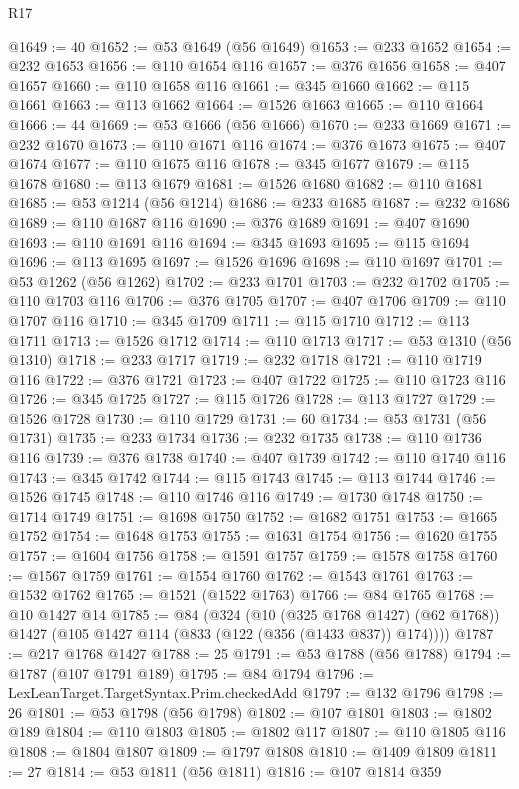 \begin{lexlean}{R17}
\begin{coremodule}
{{{{{{{{{{{{{{{{{{{{{{{{{{{{{{{{{{{{{{{{{{{{{{{{{{{{{{{{{{{{{{{{{{{{{{{{{{{{{{{{{{{{{@1649 := 40
@1652 := @53 @1649 (@56 @1649)
@1653 := @233 @1652
@1654 := @232 @1653
@1656 := @110 @1654 @116
@1657 := @376 @1656
@1658 := @407 @1657
@1660 := @110 @1658 @116
@1661 := @345 @1660
@1662 := @115 @1661
@1663 := @113 @1662
@1664 := @1526 @1663
@1665 := @110 @1664
@1666 := 44
@1669 := @53 @1666 (@56 @1666)
@1670 := @233 @1669
@1671 := @232 @1670
@1673 := @110 @1671 @116
@1674 := @376 @1673
@1675 := @407 @1674
@1677 := @110 @1675 @116
@1678 := @345 @1677
@1679 := @115 @1678
@1680 := @113 @1679
@1681 := @1526 @1680
@1682 := @110 @1681
@1685 := @53 @1214 (@56 @1214)
@1686 := @233 @1685
@1687 := @232 @1686
@1689 := @110 @1687 @116
@1690 := @376 @1689
@1691 := @407 @1690
@1693 := @110 @1691 @116
@1694 := @345 @1693
@1695 := @115 @1694
@1696 := @113 @1695
@1697 := @1526 @1696
@1698 := @110 @1697
@1701 := @53 @1262 (@56 @1262)
@1702 := @233 @1701
@1703 := @232 @1702
@1705 := @110 @1703 @116
@1706 := @376 @1705
@1707 := @407 @1706
@1709 := @110 @1707 @116
@1710 := @345 @1709
@1711 := @115 @1710
@1712 := @113 @1711
@1713 := @1526 @1712
@1714 := @110 @1713
@1717 := @53 @1310 (@56 @1310)
@1718 := @233 @1717
@1719 := @232 @1718
@1721 := @110 @1719 @116
@1722 := @376 @1721
@1723 := @407 @1722
@1725 := @110 @1723 @116
@1726 := @345 @1725
@1727 := @115 @1726
@1728 := @113 @1727
@1729 := @1526 @1728
@1730 := @110 @1729
@1731 := 60
@1734 := @53 @1731 (@56 @1731)
@1735 := @233 @1734
@1736 := @232 @1735
@1738 := @110 @1736 @116
@1739 := @376 @1738
@1740 := @407 @1739
@1742 := @110 @1740 @116
@1743 := @345 @1742
@1744 := @115 @1743
@1745 := @113 @1744
@1746 := @1526 @1745
@1748 := @110 @1746 @116
@1749 := @1730 @1748
@1750 := @1714 @1749
@1751 := @1698 @1750
@1752 := @1682 @1751
@1753 := @1665 @1752
@1754 := @1648 @1753
@1755 := @1631 @1754
@1756 := @1620 @1755
@1757 := @1604 @1756
@1758 := @1591 @1757
@1759 := @1578 @1758
@1760 := @1567 @1759
@1761 := @1554 @1760
@1762 := @1543 @1761
@1763 := @1532 @1762
@1765 := @1521 (@1522 @1763)
@1766 := @84 @1765
@1768 := @10 @1427 @14
@1785 := @84
    (@324
      (@10 (@325 @1768 @1427) (@62 @1768))
      @1427
      (@105 @1427 @114 (@833 (@122 (@356 (@1433 @837)) @174))))
@1787 := @217 @1768 @1427
@1788 := 25
@1791 := @53 @1788 (@56 @1788)
@1794 := @1787 (@107 @1791 @189)
@1795 := @84 @1794
@1796 := LexLeanTarget.TargetSyntax.Prim.checkedAdd
@1797 := @132 @1796
@1798 := 26
@1801 := @53 @1798 (@56 @1798)
@1802 := @107 @1801
@1803 := @1802 @189
@1804 := @110 @1803
@1805 := @1802 @117
@1807 := @110 @1805 @116
@1808 := @1804 @1807
@1809 := @1797 @1808
@1810 := @1409 @1809
@1811 := 27
@1814 := @53 @1811 (@56 @1811)
@1816 := @107 @1814 @359
}}}}}}}}}}}}}}}}}}}}}}}}}}}}}}}}}}}}}}}}}}}}}}}}}}}}}}}}}}}}}}}}}}}}}}}}}}}}}}}}}}}}}
\end{coremodule}
\end{lexlean}
